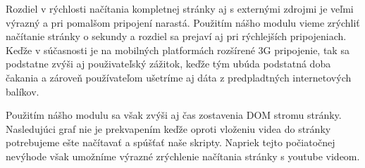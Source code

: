 Rozdiel v rýchlosti načítania kompletnej stránky aj s externými zdrojmi je veľmi výrazný a pri pomalšom pripojení narastá. Použitím nášho modulu vieme zrýchliť načítanie stránky o sekundy a rozdiel sa prejaví aj pri rýchlejších pripojeniach. Keďže v súčasnosti je na mobilných platformách rozšírené 3G pripojenie, tak sa podstatne zvýši aj použivateľský zážitok, keďže tým ubúda podstatná doba čakania a zároveň používateľom ušetríme aj dáta z predpladtných internetových balíkov.


Použitím nášho modulu sa však zvýši aj čas zostavenia DOM stromu stránky. Nasledujúci graf nie je prekvapením keďže oproti vloženiu videa do stránky potrebujeme ešte načítavať a spúšťať naše skripty. Napriek tejto počiatočnej nevýhode však umožníme výrazné zrýchlenie načítania stránky s youtube videom.

